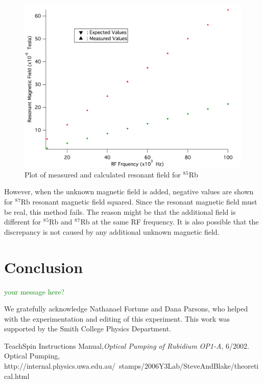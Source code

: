 \documentclass[prb,preprint]{revtex4-1}
\begin{document}
\begin{figure}[h]
\centering
\includegraphics[width=16cm]{calibration.png}
\caption{Plot of measured and calculated resonant field for $^8$$^5$Rb}
\label{caliplot}
\end{figure}

However, when the unknown magnetic field is added, negative values are shown for $^8$$^7$Rb resonant magnetic field squared. Since the resonant magnetic field must be real, this method fails. The reason might be that the additional field is different for $^8$$^5$Rb and $^8$$^7$Rb at the same RF frequency. It is also possible that the discrepancy is not caused by any additional unknown magnetic field. 


\section{Conclusion}

\textcolor{green}{your message here?}

\begin{acknowledgments}

We gratefully acknowledge Nathanael Fortune and Dana Parsons, who helped with the experimentation and editing of this experiment.  This work was supported by the Smith College Physics Department.

\end{acknowledgments}


\begin{thebibliography}{99}

 TeachSpin Instructions Manual,\textit{Optical Pumping of Rubidium OP1-A}, 6/2002.
 Optical Pumping, http://internal.physics.uwa.edu.au/~stamps/2006Y3Lab/SteveAndBlake/theoretical.html

\end{thebibliography}

\end{document}
